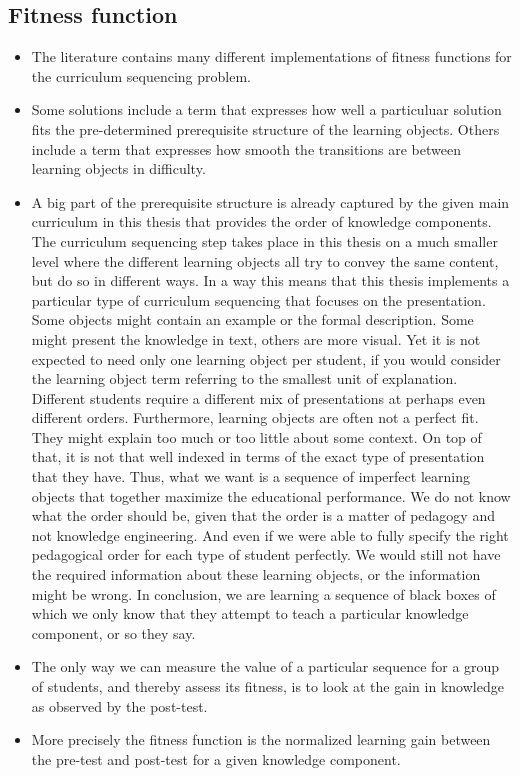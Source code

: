 \subsection{Fitness function}
\begin{itemize}
	\item The literature contains many different implementations of fitness
		functions for the curriculum sequencing problem. 
	\item Some solutions include a term that expresses how well a particuluar
		solution fits the pre-determined prerequisite structure of the learning
		objects. Others include a term that expresses how smooth the transitions
		are between learning objects in difficulty.
	\item A big part of the prerequisite structure is already captured by the
		given main curriculum in this thesis that provides the order of
		knowledge components. The curriculum sequencing step takes place
		in this thesis on a much smaller level where the different learning
		objects all try to convey the same content, but do so in different
		ways. In a way this means that this thesis implements a particular type
		of curriculum sequencing that focuses on the presentation. Some objects
		might contain an example or the formal description. Some might present
		the knowledge in text, others are more visual. Yet it is not expected
		to need only one learning object per student, if you would consider
		the learning object term referring to the smallest unit of explanation.
		Different students require a different mix of presentations at perhaps
		even different orders. Furthermore, learning objects are often not
		a perfect fit. They might explain too much or too little about some
		context. On top of that, it is not that well indexed in terms of the
		exact type of presentation that they have. Thus, what we want is a
		sequence of imperfect learning objects that together maximize the
		educational performance. We do not know what the order should be, given
		that the order is a matter of pedagogy and not knowledge engineering.
		And even if we were able to fully specify the right pedagogical order
		for each type of student perfectly. We would still not have the
		required information about these learning objects, or the information
		might be wrong. In conclusion, we are learning a sequence of black
		boxes of which we only know that they attempt to teach a particular
		knowledge component, or so they say.
	\item The only way we can measure the value of a particular sequence for a
		group of students, and thereby assess its fitness, is to look at the
		gain in knowledge as observed by the post-test.
	\item More precisely the fitness function is the normalized learning gain
		between the pre-test and post-test for a given knowledge component.
\end{itemize}
